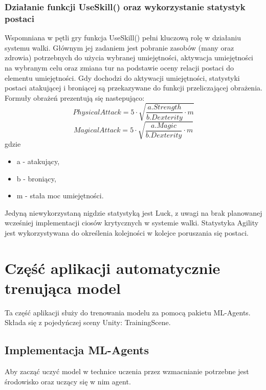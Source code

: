\documentclass{SGGW-thesis}
\begin{document}
\subsubsection{Działanie funkcji UseSkill() oraz wykorzystanie statystyk postaci}
Wspomniana w pętli gry funkcja UseSkill() pełni kluczową rolę w działaniu systemu walki. Głównym jej zadaniem jest pobranie zasobów (many oraz zdrowia) potrzebnych do użycia wybranej umiejętności, 
aktywacja umiejętności na wybranym celu oraz zmiana tur na podstawie oceny relacji postaci do elementu umiejętności. Gdy dochodzi do aktywacji umiejętności, statystyki postaci atakującej i broniącej są przekazywane do funkcji przeliczającej obrażenia. 
Formuły obrażeń prezentują się nastepująco:
\[PhysicalAttack = 5\cdot\sqrt{\frac{a.Strength}{b.Dexterity}\cdot m}\]\[MagicalAttack = 5\cdot\sqrt{\frac{a.Magic}{b.Dexterity}\cdot m}\]
gdzie
\begin{itemize}
  \item{a - atakujący},
  \item{b - broniący},
  \item{m - stała moc umiejętności}.
\end{itemize}
Jedyną niewykorzystaną nigdzie statystyką jest Luck, z uwagi na brak planowanej wcześniej implementacji ciosów krytycznych w systemie walki.
Statystyka Agility jest wykorzystywana do określenia kolejności w kolejce poruszania się postaci.


\section{Część aplikacji automatycznie trenująca model}
Ta część aplikacji służy do trenowania modelu za pomocą pakietu ML-Agents. Składa się z pojedyńczej sceny Unity: TrainingScene.

\subsection{Implementacja ML-Agents}
Aby zacząć uczyć model w technice uczenia przez wzmacnianie potrzebne jest środowisko oraz uczący się w nim agent.
\end{document}
